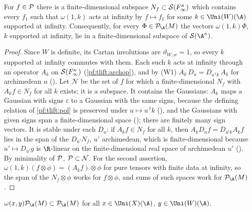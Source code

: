 \begin{lemma}\label{pf:tlift:polfin}
For $f\in\mathcal{P}$ there is a finite-dimensional subspace $N_f\subset\mathcal{S}(F_\infty^\kappa)$ which contains every $f_1$ such
that $\omega(1,k)$ acts at infinity by $f\mapsto f_1$ for some $k\in\Uni(W)(\A)$ supported at infinity. Consequently,
for every $\Phi\in\tliftPD(M)$ the vectors $\omega(1,k)\Phi$, $k$ supported at infinity, lie in a finite-dimensional
subspace of $\tliftS(\A^\kappa)$.
%
\end{lemma}

\begin{proof}
Since $W$ is definite, its Cartan involutions are $\vartheta_{W,w}=1$, so every $k$ supported at infinity commutes with
them. Each such $k$ acts at infinity through an operator $A_k$ on $\mathcal{S}(F_\infty^\kappa)$
(\cref{pf:tlift:archop}), and by (W1)
$A_k\,D_u=D_{u\,{}^tk}\,A_k$ for archimedean $u$ (). Let $\mathcal N$ be the set of
$f$ for which a finite-dimensional $N_f$ with $A_kf\in N_f$ for all $k$ exists; it is a subspace. It contains the
Gaussians: $A_k$ maps a Gaussian with signs $\varepsilon$ to a Gaussian with the same signs, because the defining relation
of \cref{pf:tlift:pol} is preserved under $u\mapsto u\,{}^tk$ (), and the
Gaussians with given signs span a finite-dimensional space (); there are
finitely many sign vectors. It is stable under each $D_u$: if $A_kf\in N_f$ for all $k$, then
$A_kD_uf=D_{u{}^tk}A_kf$ lies in the span of the $D_{u'}N_f$, $u'$ archimedean, which is finite-dimensional because
$u'\mapsto D_{u'}g$ is $\R$-linear on the finite-dimensional real space of archimedean $u'$
(). By minimality of $\mathcal{P}$, $\mathcal{P}\subset\mathcal N$. For the
second assertion, $\omega(1,k)(f\otimes\phi)=(A_kf)\otimes\phi$ for pure tensors with finite data
at infinity, so the span of the $N_f\otimes\phi$ works for $f\otimes\phi$, and sums of such
spaces work for $\tliftPD(M)$.
\end{proof}

\begin{lemma}\label{pf:tlift:polstab}
$\omega(x,y)\tliftPD(M)\subset\tliftPD(M)$ for all $x\in\Uni(X)(\A)$, $y\in\Uni(W)(\A)$.
\end{lemma}

